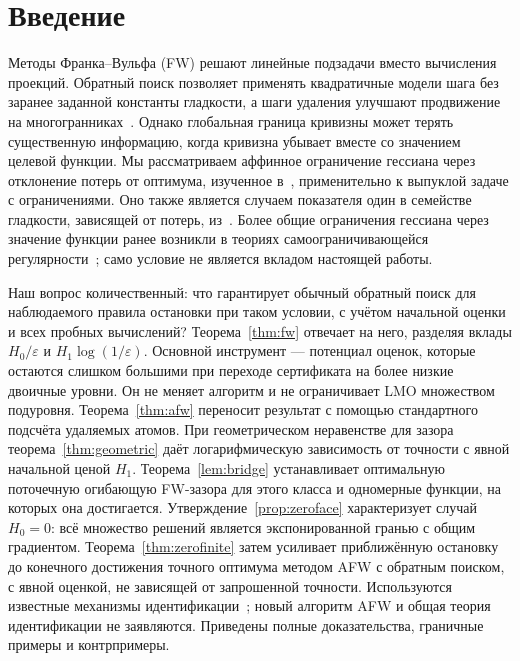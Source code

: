 \section{Введение}
Методы Франка–Вульфа (FW) решают линейные подзадачи вместо вычисления
проекций. Обратный поиск позволяет применять квадратичные модели шага
без заранее заданной константы гладкости, а шаги удаления улучшают
продвижение на многогранниках~\cite{braun,pedregosa,lacostejaggi}.
Однако глобальная граница кривизны может терять существенную информацию,
когда кривизна убывает вместе со значением целевой функции.
Мы рассматриваем аффинное ограничение гессиана через отклонение потерь
от оптимума, изученное в~\cite{warmup}, применительно к выпуклой задаче
с ограничениями. Оно также является случаем показателя один в семействе
гладкости, зависящей от потерь, из~\cite{liuwarmup}.
Более общие ограничения гессиана через значение функции
ранее возникли в теориях самоограничивающейся
регулярности~\cite{kale,caoselfbound}; само условие не является
вкладом настоящей работы.

Наш вопрос количественный: что гарантирует обычный обратный поиск
для наблюдаемого правила остановки при таком условии, с учётом
начальной оценки и всех пробных вычислений? Теорема~\ref{thm:fw}
отвечает на него, разделяя вклады $H_0/\varepsilon$ и
$H_1\log(1/\varepsilon)$. Основной инструмент — потенциал оценок,
которые остаются слишком большими при переходе сертификата на более
низкие двоичные уровни. Он не меняет алгоритм и не ограничивает LMO
множеством подуровня. Теорема~\ref{thm:afw} переносит результат с
помощью стандартного подсчёта удаляемых атомов. При геометрическом
неравенстве для зазора теорема~\ref{thm:geometric} даёт логарифмическую
зависимость от точности с явной начальной ценой $H_1$.
Теорема~\ref{lem:bridge} устанавливает оптимальную поточечную огибающую
FW-зазора для этого класса и одномерные функции, на которых она
достигается. Утверждение~\ref{prop:zeroface} характеризует случай
$H_0=0$: всё множество решений является экспонированной гранью с общим
градиентом. Теорема~\ref{thm:zerofinite} затем усиливает приближённую
остановку до конечного достижения точного оптимума методом AFW с
обратным поиском, с явной оценкой, не зависящей от запрошенной точности.
Используются известные механизмы идентификации~\cite{bomze,garber};
новый алгоритм AFW и общая теория идентификации не заявляются.
Приведены полные доказательства, граничные примеры и контрпримеры.

